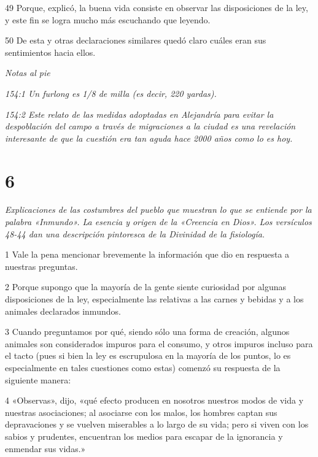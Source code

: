 \par 49 Porque, explicó, la buena vida consiste en observar las disposiciones de la ley, y este fin se logra mucho más escuchando que leyendo.

\par 50 De esta y otras declaraciones similares quedó claro cuáles eran sus sentimientos hacia ellos.

\par \textit{Notas al pie}

\par \textit{154:1 Un furlong es 1/8 de milla (es decir, 220 yardas).}

\par \textit{154:2 Este relato de las medidas adoptadas en Alejandría para evitar la despoblación del campo a través de migraciones a la ciudad es una revelación interesante de que la cuestión era tan aguda hace 2000 años como lo es hoy.}

\chapter{6}

\par \textit{Explicaciones de las costumbres del pueblo que muestran lo que se entiende por la palabra «Inmundo». La esencia y origen de la «Creencia en Dios». Los versículos 48-44 dan una descripción pintoresca de la Divinidad de la fisiología.}

\par 1 Vale la pena mencionar brevemente la información que dio en respuesta a nuestras preguntas.

\par 2 Porque supongo que la mayoría de la gente siente curiosidad por algunas disposiciones de la ley, especialmente las relativas a las carnes y bebidas y a los animales declarados inmundos.

\par 3 Cuando preguntamos por qué, siendo sólo una forma de creación, algunos animales son considerados impuros para el consumo, y otros impuros incluso para el tacto (pues si bien la ley es escrupulosa en la mayoría de los puntos, lo es especialmente en tales cuestiones como estas) comenzó su respuesta de la siguiente manera:

\par 4 «Observas», dijo, «qué efecto producen en nosotros nuestros modos de vida y nuestras asociaciones; al asociarse con los malos, los hombres captan sus depravaciones y se vuelven miserables a lo largo de su vida; pero si viven con los sabios y prudentes, encuentran los medios para escapar de la ignorancia y enmendar sus vidas.»

